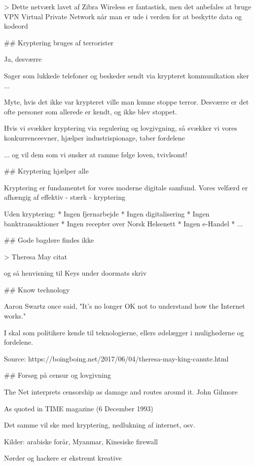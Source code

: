 \documentclass[20pt,landscape,a4paper,footrule]{foils}
\begin{document}
> Dette netværk lavet af Zibra Wireless er fantastisk, men det anbefales at bruge VPN Virtual Private Network når man er ude i verden for at beskytte data og kodeord



## Kryptering bruges af terrorister

Ja, desværre

Sager som lukkede telefoner og beskeder sendt via krypteret kommunikation sker ...

Myte, hvis det ikke var krypteret ville man kunne stoppe terror. Desværre er det ofte personer som allerede er kendt, og ikke blev stoppet.

Hvis vi svækker kryptering via regulering og lovgivgning, så svækker vi vores konkurrenceevner, hjælper industrispionage, taber fordelene

... og vil dem som vi ønsker at ramme følge loven, tvivlsomt!

## Kryptering hjælper alle

Kryptering er fundamentet for vores moderne digitale samfund. Vores velfærd er afhængig af effektiv - stærk - kryptering

Uden kryptering:
* Ingen fjernarbejde
* Ingen digitalisering
* Ingen banktransaktioner
* Ingen recepter over Norsk Helsenett
* Ingen e-Handel
* ...



## Gode bagdøre findes ikke

> Theresa May citat

og så henvisning til Keys under doormats skriv



## Know technology

Aaron Swartz once said, "It's no longer OK not to understand how the Internet works."

I skal som politikere kende til teknologierne, ellers ødelægger i mulighederne og fordelene.

Source:
https://boingboing.net/2017/06/04/theresa-may-king-canute.html

## Forsøg på censur og lovgivning

The Net interprets censorship as damage and routes around it. John Gilmore

As quoted in TIME magazine (6 December 1993)

Det samme vil ske med kryptering, nedlukning af internet, osv.

Kilder: arabiske forår, Myanmar, Kinesiske firewall

\centerline{Nørder og hackere er ekstremt kreative}
\end{document}

